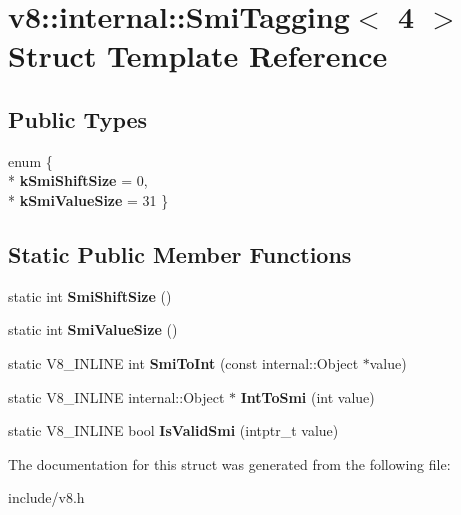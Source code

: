 \hypertarget{structv8_1_1internal_1_1_smi_tagging_3_014_01_4}{}\section{v8\+:\+:internal\+:\+:Smi\+Tagging$<$ 4 $>$ Struct Template Reference}
\label{structv8_1_1internal_1_1_smi_tagging_3_014_01_4}
\subsection*{Public Types}
\begin{DoxyCompactItemize}
\item 
enum \{ \\*
{\bfseries k\+Smi\+Shift\+Size} = 0, 
\\*
{\bfseries k\+Smi\+Value\+Size} = 31
 \}\hypertarget{structv8_1_1internal_1_1_smi_tagging_3_014_01_4_a4a08a18726d053536f2e1988bb1e1cfa}{}\label{structv8_1_1internal_1_1_smi_tagging_3_014_01_4_a4a08a18726d053536f2e1988bb1e1cfa}

\end{DoxyCompactItemize}
\subsection*{Static Public Member Functions}
\begin{DoxyCompactItemize}
\item 
static int {\bfseries Smi\+Shift\+Size} ()\hypertarget{structv8_1_1internal_1_1_smi_tagging_3_014_01_4_a6b4e44bb5de76851c70fb604e1a7a019}{}\label{structv8_1_1internal_1_1_smi_tagging_3_014_01_4_a6b4e44bb5de76851c70fb604e1a7a019}

\item 
static int {\bfseries Smi\+Value\+Size} ()\hypertarget{structv8_1_1internal_1_1_smi_tagging_3_014_01_4_a07e9a8ef19de5cb4bba23cd9756d7b3e}{}\label{structv8_1_1internal_1_1_smi_tagging_3_014_01_4_a07e9a8ef19de5cb4bba23cd9756d7b3e}

\item 
static V8\+\_\+\+I\+N\+L\+I\+NE int {\bfseries Smi\+To\+Int} (const internal\+::\+Object $\ast$value)\hypertarget{structv8_1_1internal_1_1_smi_tagging_3_014_01_4_a62bf3521541e99483c8d0743685dc375}{}\label{structv8_1_1internal_1_1_smi_tagging_3_014_01_4_a62bf3521541e99483c8d0743685dc375}

\item 
static V8\+\_\+\+I\+N\+L\+I\+NE internal\+::\+Object $\ast$ {\bfseries Int\+To\+Smi} (int value)\hypertarget{structv8_1_1internal_1_1_smi_tagging_3_014_01_4_abbc2788d901a590f3b9276e7e0d4059b}{}\label{structv8_1_1internal_1_1_smi_tagging_3_014_01_4_abbc2788d901a590f3b9276e7e0d4059b}

\item 
static V8\+\_\+\+I\+N\+L\+I\+NE bool {\bfseries Is\+Valid\+Smi} (intptr\+\_\+t value)\hypertarget{structv8_1_1internal_1_1_smi_tagging_3_014_01_4_a7ca3b3a7b14e2fbea5decac3675ac619}{}\label{structv8_1_1internal_1_1_smi_tagging_3_014_01_4_a7ca3b3a7b14e2fbea5decac3675ac619}

\end{DoxyCompactItemize}


The documentation for this struct was generated from the following file\+:\begin{DoxyCompactItemize}
\item 
include/v8.\+h\end{DoxyCompactItemize}
